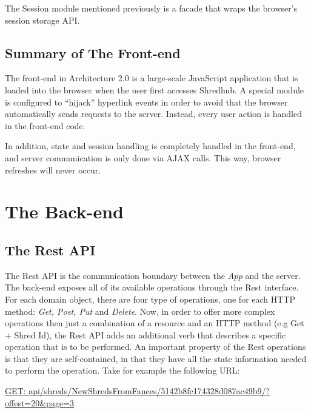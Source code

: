The Session module mentioned previously is a facade that wraps the browser's session storage API.

\subsection{Summary of The Front-end}
The front-end in Architecture 2.0 is a large-scale JavaScript application that is loaded into the browser when the user first accesses Shredhub. A special module is configured to ``hijack'' hyperlink events in order to avoid that the browser automatically sends requests to the server. Instead, every user action is handled in the front-end code. 

In addition, state and session handling is completely handled in the front-end, and server communication is only done via AJAX calls. This way, browser refreshes will never occur. 


\section{The Back-end}
\subsection{The Rest API}
The Rest API is the communication boundary between the \textit{App} and the server. The back-end exposes all of its available operations through the Rest interface. For each domain object, there are four type of operations, one for each HTTP method: \textit{Get, Post, Put} and \textit{Delete}. Now, in order to offer more complex operations then just a combination of a resource and an HTTP method (e.g Get + Shred Id), the Rest API adds an additional verb that describes a specific operation that is to be performed. An important property of the Rest operations is that they are self-contained, in that they have all the state information needed to perform the operation. Take for example the following URL: 

\url{GET: api/shreds/NewShredsFromFanees/5142b8fc174328d087ac49b9/?offest=20&page=3}

